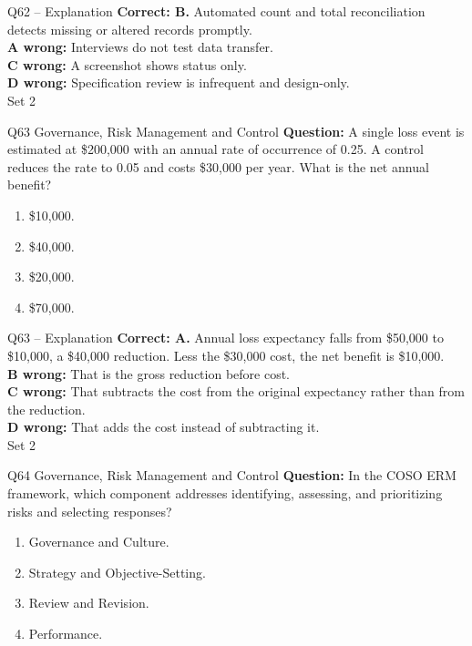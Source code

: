 \documentclass[aspectratio=169,10pt]{beamer}
\begin{document}
\begin{frame}[t]{Q62 -- Explanation}
	\footnotesize
	\textbf{Correct: B.} Automated count and total reconciliation detects missing or altered records promptly. \\[5pt]
\textbf{A wrong:} Interviews do not test data transfer. \\[3pt]
\textbf{C wrong:} A screenshot shows status only. \\[3pt]
\textbf{D wrong:} Specification review is infrequent and design-only. \\[3pt]
	\vfill {\tiny Set 2}
\end{frame}

\begin{frame}[t]{Q63 \hfill {\scriptsize Governance, Risk Management and Control}}
	\small
	\textbf{Question:} A single loss event is estimated at \$200,000 with an annual rate of occurrence of 0.25. A control reduces the rate to 0.05 and costs \$30,000 per year. What is the net annual benefit?
	\begin{enumerate}[label=\Alph*.,itemsep=1pt,topsep=3pt]
			\item \$10,000.
			\item \$40,000.
			\item \$20,000.
			\item \$70,000.
	\end{enumerate}
\end{frame}

\begin{frame}[t]{Q63 -- Explanation}
	\footnotesize
	\textbf{Correct: A.} Annual loss expectancy falls from \$50,000 to \$10,000, a \$40,000 reduction. Less the \$30,000 cost, the net benefit is \$10,000. \\[5pt]
\textbf{B wrong:} That is the gross reduction before cost. \\[3pt]
\textbf{C wrong:} That subtracts the cost from the original expectancy rather than from the reduction. \\[3pt]
\textbf{D wrong:} That adds the cost instead of subtracting it. \\[3pt]
	\vfill {\tiny Set 2}
\end{frame}

\begin{frame}[t]{Q64 \hfill {\scriptsize Governance, Risk Management and Control}}
	\small
	\textbf{Question:} In the COSO ERM framework, which component addresses identifying, assessing, and prioritizing risks and selecting responses?
	\begin{enumerate}[label=\Alph*.,itemsep=1pt,topsep=3pt]
			\item Governance and Culture.
			\item Strategy and Objective-Setting.
			\item Review and Revision.
			\item Performance.
	\end{enumerate}
\end{frame}
\end{document}
